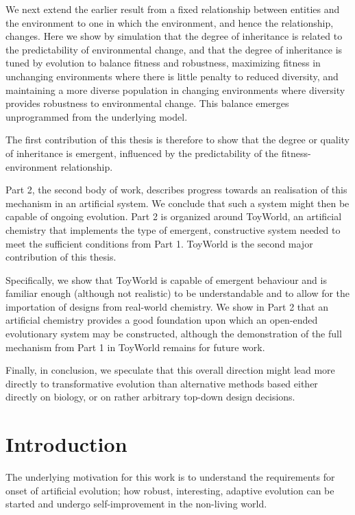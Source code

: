 \documentclass[]{report}
\begin{document}
{We next extend the earlier result from a fixed relationship between entities and the environment to one in which the environment, and hence the relationship, changes. Here we show by simulation that the degree of inheritance is related to the predictability of environmental change, and that the degree of inheritance is tuned by evolution to balance fitness and robustness, maximizing fitness in unchanging environments where there is little penalty to reduced diversity, and maintaining a more diverse population in changing environments where diversity provides robustness to environmental change. This balance emerges unprogrammed from the underlying model.

The first contribution of this thesis is therefore to show that the degree or quality of inheritance is emergent, influenced by the predictability of the fitness-environment relationship. 

Part 2, the second body of work, describes progress towards an realisation of this mechanism in an artificial system. We conclude that such a system might then be capable of ongoing evolution. Part 2 is organized around ToyWorld, an artificial chemistry that implements the type of emergent, constructive system needed to meet the sufficient conditions from Part 1. ToyWorld is the second major contribution of this thesis.

Specifically, we show that ToyWorld is capable of emergent behaviour and is familiar enough (although not realistic) to be understandable and to allow for the importation of designs from real-world chemistry. We show in Part 2 that an artificial chemistry provides a good foundation upon which an open-ended evolutionary system may be constructed, although the demonstration of the full mechanism from Part 1 in ToyWorld remains for future work.

Finally, in conclusion, we speculate that this overall direction might lead more directly to transformative evolution than alternative methods based either directly on biology, or on rather arbitrary top-down design decisions.}

\clearpage
\chapter{Introduction}

The underlying motivation for this work is to understand the requirements for onset of artificial evolution; how robust, interesting, adaptive evolution can be started and undergo self-improvement in the non-living world.
\end{document}
